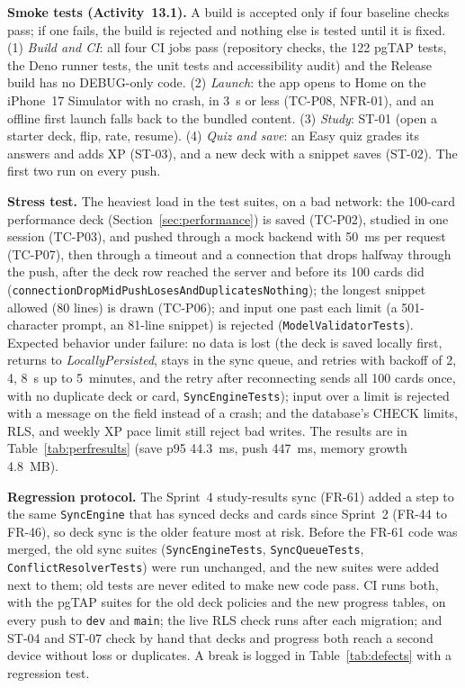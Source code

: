 \documentclass[12pt,letterpaper]{article}
\begin{document}
\textbf{Smoke tests (Activity~13.1).} A build is accepted only if four baseline
checks pass; if one fails, the build is rejected and nothing else is tested until it
is fixed. (1) \emph{Build and CI}: all four CI jobs pass (repository checks, the 122
pgTAP tests, the Deno runner tests, the unit tests and accessibility audit) and the Release build has no
DEBUG-only code. (2) \emph{Launch}: the app opens to Home on the iPhone~17 Simulator
with no crash, in 3~s or less (TC-P08, NFR-01), and an offline first launch falls
back to the bundled content. (3) \emph{Study}: ST-01 (open a starter deck, flip,
rate, resume). (4) \emph{Quiz and save}: an Easy quiz grades its answers and adds XP
(ST-03), and a new deck with a snippet saves (ST-02). The first two run on every push.

\textbf{Stress test.} The heaviest load in the test suites, on a bad network: the
100-card performance deck (Section~\ref{sec:performance}) is saved (TC-P02), studied in
one session (TC-P03), and pushed through a mock backend with 50~ms per request
(TC-P07), then through a timeout and a connection that drops halfway through the push,
after the deck row reached the server and before its 100 cards did
(\texttt{connectionDropMidPushLosesAndDuplicatesNothing}); the longest snippet allowed (80 lines) is drawn
(TC-P06); and input one past each limit (a 501-character prompt, an 81-line snippet)
is rejected (\texttt{ModelValidatorTests}). Expected
behavior under failure: no data is lost (the deck is saved locally first, returns to
\textit{LocallyPersisted}, stays in the sync queue, and retries with backoff of 2, 4,
8~s up to 5~minutes, and the retry after reconnecting sends all 100 cards once, with
no duplicate deck or card, \texttt{SyncEngineTests}); input over a limit is rejected with a
message on the field instead of a crash; and the database's CHECK limits, RLS, and
weekly XP pace limit still reject bad writes. The results are in
Table~\ref{tab:perfresults} (save p95 44.3~ms, push 447~ms, memory growth 4.8~MB).

\textbf{Regression protocol.} The Sprint~4 study-results sync (FR-61) added a step to
the same \texttt{SyncEngine} that has synced decks and cards since Sprint~2 (FR-44 to
FR-46), so deck sync is the older feature most at risk. Before the FR-61 code was
merged, the old sync suites (\texttt{SyncEngineTests}, \texttt{SyncQueueTests},
\texttt{ConflictResolverTests}) were run unchanged, and the new suites were added next
to them; old tests are never edited to make new code pass. CI runs both, with the
pgTAP suites for the old deck policies and the new progress tables, on every push to
\texttt{dev} and \texttt{main}; the live RLS check runs after each migration; and
ST-04 and ST-07 check by hand that decks and progress both reach a second device
without loss or duplicates. A break is logged in Table~\ref{tab:defects} with a
regression test.
\end{document}
